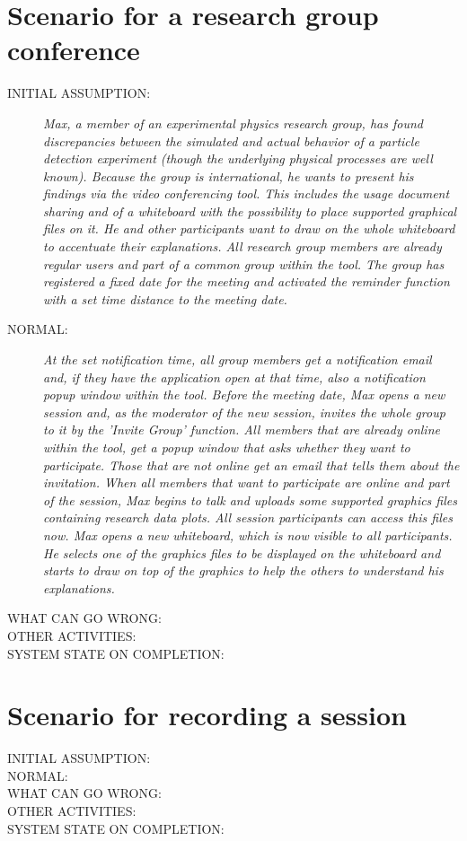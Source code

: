 \section{Scenario for a research group conference}
\begin{description}
\item[INITIAL ASSUMPTION:]
\textit{Max, a member of an experimental physics research group, has found
discrepancies between the simulated and actual behavior of a particle detection
experiment (though the underlying physical processes are well known). Because
the group is international, he wants to present his findings via the video
conferencing tool. This includes the usage document sharing and of a whiteboard
with the possibility to place supported graphical files on it. He and other
participants want to draw on the whole whiteboard to accentuate their
explanations. All research group members are already regular users and part of a
common group within the tool. The group has registered a fixed date for the
meeting and activated the reminder function with a set time distance to the
meeting date.}
\item[NORMAL:]
\textit{At the set notification time, all group
members get a notification email and, if they have the application open at that time, also
a notification popup window within the tool. Before the meeting date, Max opens
a new session and, as the moderator of the new session, invites the whole group
to it by the 'Invite Group' function.
All members that are already online within the tool, get a popup window that asks
whether they want to participate. Those that are not online get an email that
tells them about the invitation. When all members that want to participate are
online and part of the session, Max begins to talk and uploads some
supported graphics files containing research data plots. All session
participants can access this files now. Max opens a new whiteboard, which is
now visible to all participants. He selects one of the graphics files to be
displayed on the whiteboard and starts to draw on top of the graphics to help
the others to understand his explanations.}
\item[WHAT CAN GO WRONG:]
\item[OTHER ACTIVITIES:]
\item[SYSTEM STATE ON COMPLETION:]
\end{description}

\section{Scenario for recording a session}
\begin{description}
\item[INITIAL ASSUMPTION:]
\item[NORMAL:]
\item[WHAT CAN GO WRONG:]
\item[OTHER ACTIVITIES:]
\item[SYSTEM STATE ON COMPLETION:]
\end{description}